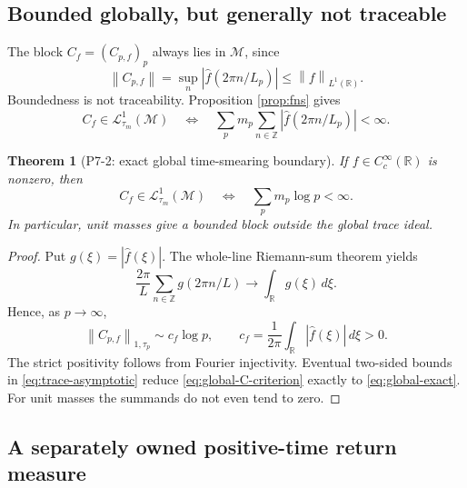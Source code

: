 \documentclass[11pt,a4paper]{article}
\newtheorem{theorem}{Theorem}[section]
\theoremstyle{definition}
\newcommand{\R}{\mathbb R}
\newcommand{\Z}{\mathbb Z}
\newcommand{\M}{\mathcal M}
\newcommand{\Lc}{\mathcal L}
\newcommand{\norm}[1]{\left\lVert #1\right\rVert}
\newcommand{\abs}[1]{\left\lvert #1\right\rvert}
\begin{document}
\subsection{Bounded globally, but generally not traceable}

The block $C_f=(C_{p,f})_p$ always lies in $\M$, since
\begin{equation}
 \norm{C_{p,f}}=\sup_n\abs{\widehat f(2\pi n/L_p)}
 \leq \norm f_{L^1(\R)}.
\end{equation}
Boundedness is not traceability.  Proposition \ref{prop:fns} gives
\begin{equation}
 C_f\in\Lc^1_{\tau_m}(\M)
 \quad\Longleftrightarrow\quad
 \sum_p m_p\sum_{n\in\Z}
       \abs{\widehat f(2\pi n/L_p)}<\infty .
 \label{eq:global-C-criterion}
\end{equation}

\begin{theorem}[P7-2: exact global time-smearing boundary]
\label{thm:p72}
If $f\in C_c^\infty(\R)$ is nonzero, then
\begin{equation}
 C_f\in\Lc^1_{\tau_m}(\M)
 \quad\Longleftrightarrow\quad
 \sum_p m_p\log p<\infty .
 \label{eq:global-exact}
\end{equation}
In particular, unit masses give a bounded block outside the global trace
ideal.
\end{theorem}

\begin{proof}
Put $g(\xi)=|\widehat f(\xi)|$.  The whole-line Riemann-sum theorem yields
\begin{equation}
 \frac{2\pi}{L}\sum_{n\in\Z}g(2\pi n/L)
 \longrightarrow \int_{\R}g(\xi)\,d\xi .
\end{equation}
Hence, as $p\to\infty$,
\begin{equation}
 \norm{C_{p,f}}_{1,\tau_p}
 \sim c_f\log p,
 \qquad
 c_f=\frac{1}{2\pi}\int_{\R}|\widehat f(\xi)|\,d\xi>0.
 \label{eq:trace-asymptotic}
\end{equation}
The strict positivity follows from Fourier injectivity.  Eventual two-sided
bounds in \eqref{eq:trace-asymptotic} reduce
\eqref{eq:global-C-criterion} exactly to \eqref{eq:global-exact}.  For unit
masses the summands do not even tend to zero.
\end{proof}

\subsection{A separately owned positive-time return measure}
\end{document}
